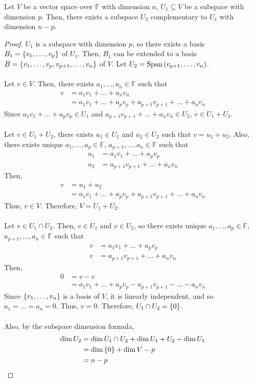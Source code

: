 \documentclass[letterpaper,12pt]{article}
\begin{document}
\begin{theorem}
Let $V$ be a vector space over $\mathbb{F}$ with dimension $n$, $U_1 \subseteq V$ be a subspace with dimension $p$. Then, there exists a subspace $U_2$ complementary to $U_1$ with dimension $n - p$.
\end{theorem}
\begin{proof}
$U_1$ is a subspace with dimension $p$, so there exists a basis $B_1 = \left\{ v_1, \dots, v_p \right\}$ of $U_1$. Then, $B_1$ can be extended to a basis $B = \left\{ v_1, \dots, v_p, v_{p+1}, \dots, v_n \right\}$ of $V$. Let $U_2 = \text{Span}\left(v_{p+1}, \dots, v_n \right)$.
\\ \\ Let $v \in V$. Then, there exists $a_1, \dots, a_n \in \mathbb{F}$ such that
\begin{align*}
    v & = a_1 v_1 + \dots + a_n v_n \\
    & = a_1 v_1 + \dots + a_p v_p + a_{p+1} v_{p+1} + \dots + a_n v_n
\end{align*}
Since $a_1 v_1 + \dots + a_p v_p \in U_1$ and $a_{p+1} v_{p+1} + \dots + a_n v_n \in U_2$, $v \in U_1 + U_2$.
\\ \\ Let $v \in U_1 + U_2$, there exists $u_1 \in U_1$ and $u_2 \in U_2$ such that $v = u_1 + u_2$. Also, there exists unique $a_1, \dots, a_p \in \mathbb{F}$, $a_{p+1}, \dots, a_n \in \mathbb{F}$ such that
\begin{align*}
    u_1 & = a_1 v_1 + \dots + a_p v_p \\
    u_2 & = a_{p+1} v_{p+1} + \dots + a_n v_n
\end{align*}
Then,
\begin{align*}
    v & = u_1 + u_2 \\
    & = a_1 v_1 + \dots + a_p v_p + a_{p+1} v_{p+1} + \dots + a_n v_n
\end{align*}
Thus, $v \in V$. Therefore, $V = U_1 + U_2$.
\\ \\ Let $v \in U_1 \cap U_2$. Then, $v \in U_1$ and $v \in U_2$, so there exists unique $a_1, \dots, a_p \in \mathbb{F}$, $a_{p+1}, \dots, a_n \in \mathbb{F}$ such that
\begin{align*}
    v & = a_1 v_1 + \dots + a_p v_p \\
    v & = a_{p+1} v_{p+1} + \dots + a_n v_n
\end{align*}
Then,
\begin{align*}
    0 & = v - v \\
    & = a_1 v_1 + \dots + a_p v_p - a_{p+1} v_{p+1} - \dots - a_n v_n
\end{align*}
Since $\left\{ v_1, \dots, v_n \right\}$ is a basis of $V$, it is linearly independent, and so $a_1 = \dots = a_n = 0$. Thus, $v = 0$. Therefore, $U_1 \cap U_2 = \left\{ 0 \right\}$.
\\ \\ Also, by the subspace dimension formula,
\begin{align*}
    \dim{U_2} & = \dim{U_1 \cap U_2} + \dim{U_1 + U_2} - \dim{U_1} \\
    & = \dim{\left\{ 0 \right\}} + \dim{V} - p \\
    & = n - p
\end{align*}
\end{proof}
\end{document}
